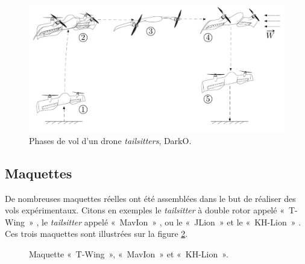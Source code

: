 \begin{figure}[ht!]
    \centering
        \includegraphics[width=0.8\columnwidth]{figures/darko_transition.png}
        \caption{Phases de vol d'un drone \textit{tailsitters}, DarkO.}
        \label{fig:darko_flight}
\end{figure}

\subsection*{Maquettes}

De nombreuses maquettes réelles ont été assemblées dans le but de réaliser des vols expérimentaux. Citons en exemples le \textit{tailsitter} à double rotor appelé «~T-Wing~» \cite{Stone2002PreliminaryDO, TWing2008}, le \textit{tailsitter} appelé «~MavIon~» \cite{oatao14575}, ou le «~JLion~» et le «~KH-Lion~» \cite{8003167}. Ces trois maquettes sont illustrées sur la figure \ref{fig:maquettetailsitter}.

\begin{figure}[ht!]
    \centering
    \caption{Maquette «~T-Wing~», «~MavIon~» et «~KH-Lion~».}
    \label{fig:maquettetailsitter}
\end{figure}


